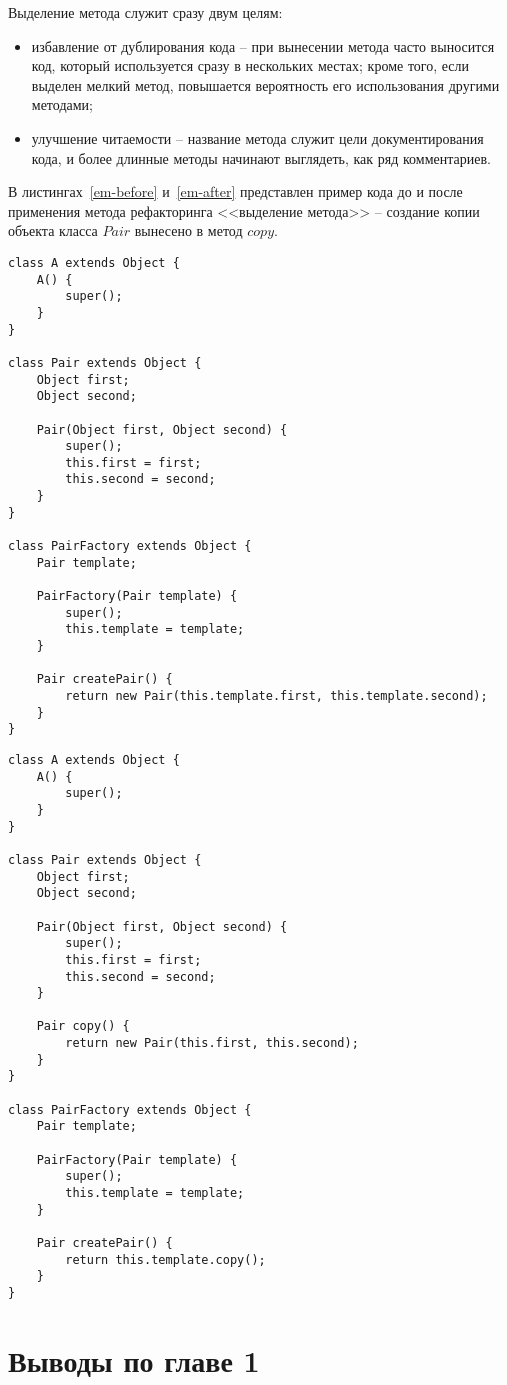 Выделение метода служит сразу двум целям:
\begin{itemize}
    \item избавление от дублирования кода -- при вынесении метода часто выносится код, который используется сразу в нескольких местах;
    кроме того, если выделен мелкий метод, повышается вероятность его использования другими методами;
    \item улучшение читаемости -- название метода служит цели документирования кода,
    и более длинные методы начинают выглядеть, как ряд комментариев.
\end{itemize}
В листингах~\ref{em-before} и~\ref{em-after} представлен пример кода до и после применения метода рефакторинга <<выделение метода>> --
создание копии объекта класса $Pair$ вынесено в метод $copy$.
\lstset{
    language=Java,
    basicstyle=\small\ttfamily,
    frame=single,
    captionpos=b
}
\begin{lstlisting}[float=htb,label=em-before,caption=Код до проведения рефакторинга]
class A extends Object {
    A() {
        super();
    }
}

class Pair extends Object {
    Object first;
    Object second;

    Pair(Object first, Object second) {
        super();
        this.first = first;
        this.second = second;
    }
}

class PairFactory extends Object {
    Pair template;

    PairFactory(Pair template) {
        super();
        this.template = template;
    }

    Pair createPair() {
        return new Pair(this.template.first, this.template.second);
    }
}
\end{lstlisting}
\begin{lstlisting}[float=htb,label=em-after,caption=Код после вынесения метода]
class A extends Object {
    A() {
        super();
    }
}

class Pair extends Object {
    Object first;
    Object second;

    Pair(Object first, Object second) {
        super();
        this.first = first;
        this.second = second;
    }

    Pair copy() {
        return new Pair(this.first, this.second);
    }
}

class PairFactory extends Object {
    Pair template;

    PairFactory(Pair template) {
        super();
        this.template = template;
    }

    Pair createPair() {
        return this.template.copy();
    }
}
\end{lstlisting}
\section*{Выводы по главе 1}
